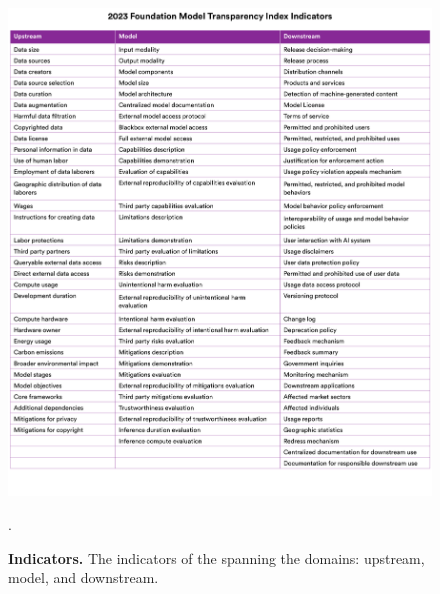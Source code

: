 \begin{figure}
\centering
\includegraphics[keepaspectratio, height=\textheight, width=\textwidth]{figures/indicators_list.pdf}
\caption{\textbf{Indicators.} The \numindicators indicators of the \projectname spanning the \numdomains domains: upstream, model, and downstream.
}.
\label{fig:indicators}
\end{figure}


